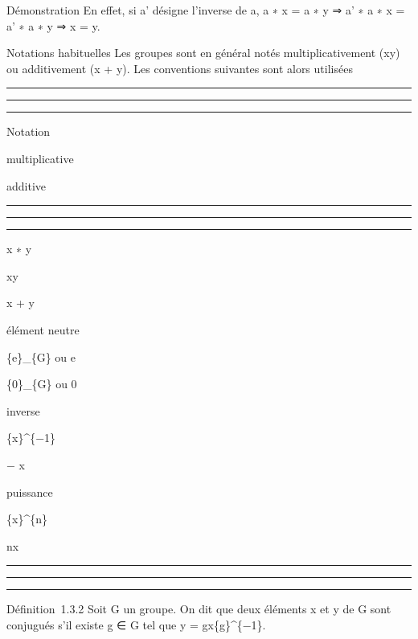 \documentclass[]{article}
\begin{document}
Démonstration En effet, si a' désigne l'inverse de a, a ∗ x = a ∗ y ⇒ a'
∗ a ∗ x = a' ∗ a ∗ y ⇒ x = y.

Notations habituelles Les groupes sont en général notés
multiplicativement (xy) ou additivement (x + y). Les conventions
suivantes sont alors utilisées

\begin{center}\rule{3in}{0.4pt}\end{center}

\begin{center}\rule{3in}{0.4pt}\end{center}

\begin{center}\rule{3in}{0.4pt}\end{center}

Notation

multiplicative

additive

\begin{center}\rule{3in}{0.4pt}\end{center}

\begin{center}\rule{3in}{0.4pt}\end{center}

\begin{center}\rule{3in}{0.4pt}\end{center}

x ∗ y

xy

x + y

élément neutre

\{e\}\_\{G\} ou e

\{0\}\_\{G\} ou 0

inverse

\{x\}\^{}\{−1\}

− x

puissance

\{x\}\^{}\{n\}

nx

\begin{center}\rule{3in}{0.4pt}\end{center}

\begin{center}\rule{3in}{0.4pt}\end{center}

\begin{center}\rule{3in}{0.4pt}\end{center}

Définition~1.3.2 Soit G un groupe. On dit que deux éléments x et y de G
sont conjugués s'il existe g ∈ G tel que y = gx\{g\}\^{}\{−1\}.
\end{document}
